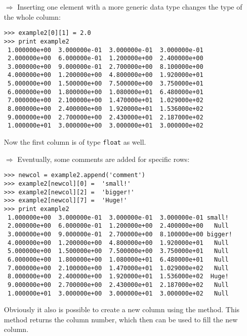 \begin{itemize}
\item[$\Rightarrow$] Inserting one element with a more generic data type changes the type of the whole column:
\begin{small}
\begin{verbatim}
>>> example2[0][1] = 2.0
>>> print example2
 1.000000e+00  3.000000e-01  3.000000e-01  3.000000e-01
 2.000000e+00  6.000000e-01  1.200000e+00  2.400000e+00
 3.000000e+00  9.000000e-01  2.700000e+00  8.100000e+00
 4.000000e+00  1.200000e+00  4.800000e+00  1.920000e+01
 5.000000e+00  1.500000e+00  7.500000e+00  3.750000e+01
 6.000000e+00  1.800000e+00  1.080000e+01  6.480000e+01
 7.000000e+00  2.100000e+00  1.470000e+01  1.029000e+02
 8.000000e+00  2.400000e+00  1.920000e+01  1.536000e+02
 9.000000e+00  2.700000e+00  2.430000e+01  2.187000e+02
 1.000000e+01  3.000000e+00  3.000000e+01  3.000000e+02
\end{verbatim}
\end{small}
Now the first column is of type {\tt float} as well.

\item[$\Rightarrow$] Eventually, some comments are added for specific
rows:
\begin{small}
\begin{verbatim}
>>> newcol = example2.append('comment')
>>> example2[newcol][0] =  'small!'            
>>> example2[newcol][2] =  'bigger!'
>>> example2[newcol][7] =  'Huge!'
>>> print example2
 1.000000e+00  3.000000e-01  3.000000e-01  3.000000e-01 small!
 2.000000e+00  6.000000e-01  1.200000e+00  2.400000e+00   Null
 3.000000e+00  9.000000e-01  2.700000e+00  8.100000e+00 bigger!
 4.000000e+00  1.200000e+00  4.800000e+00  1.920000e+01   Null
 5.000000e+00  1.500000e+00  7.500000e+00  3.750000e+01   Null
 6.000000e+00  1.800000e+00  1.080000e+01  6.480000e+01   Null
 7.000000e+00  2.100000e+00  1.470000e+01  1.029000e+02   Null
 8.000000e+00  2.400000e+00  1.920000e+01  1.536000e+02  Huge!
 9.000000e+00  2.700000e+00  2.430000e+01  2.187000e+02   Null
 1.000000e+01  3.000000e+00  3.000000e+01  3.000000e+02   Null
\end{verbatim}
\end{small}
Obviously it also is possible to create a new column using the
 method.
This method returns the column number, which then can be used
to fill the new column.


\end{itemize}

